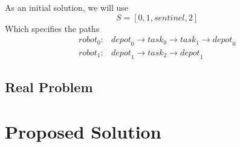 \documentclass[a4paper]{article}
\begin{document}
As an initial solution, we will use
$$S = [0, 1, \mathit{sentinel}, 2 ]$$
Which specifies the paths
\begin{align*}
\mathit{robot}_0: & \mathit{depot}_0 \rightarrow \mathit{task}_0 \rightarrow \mathit{task}_1 \rightarrow  \mathit{depot}_0 \\
\mathit{robot}_1: & \mathit{depot}_1 \rightarrow \mathit{task}_2 \rightarrow \mathit{depot}_1
\end{align*}

\subsection{Real Problem}



\section{Proposed Solution}





\end{document}
